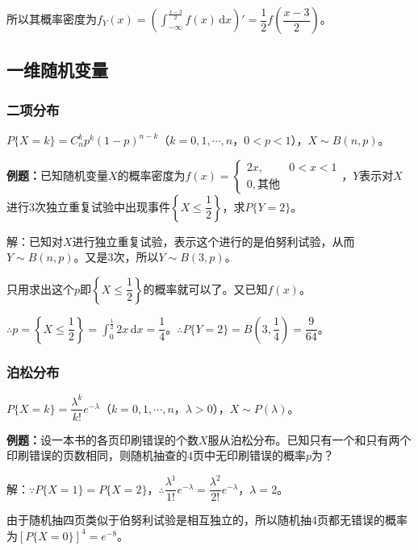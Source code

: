 所以其概率密度为$f_Y(x)=(\int_{-\infty}^{\frac{x-3}{2}}f(x)\,\textrm{d}x)'=\dfrac{1}{2}f\left(\dfrac{x-3}{2}\right)$。

\subsection{一维随机变量}

\paragraph{}

\subsubsection{二项分布}

$P\{X=k\}=C_n^kp^k(1-p)^{n-k}$（$k=0,1,\cdots,n$，$0<p<1$），$X\sim B(n,p)$。

\textbf{例题：}已知随机变量$X$的概率密度为$f(x)=\left\{\begin{array}{ll}
    2x, & 0<x<1 \\
    0, \text{其他}
\end{array}\right.$，$Y$表示对$X$进行3次独立重复试验中出现事件$\left\{X\leqslant\dfrac{1}{2}\right\}$，求$P\{Y=2\}$。\medskip

解：已知对$X$进行独立重复试验，表示这个进行的是伯努利试验，从而$Y\sim B(n,p)$。又是3次，所以$Y\sim B(3,p)$。

只用求出这个$p$即$\left\{X\leqslant\dfrac{1}{2}\right\}$的概率就可以了。又已知$f(x)$。

$\therefore p=\left\{X\leqslant\dfrac{1}{2}\right\}=\int_0^\frac{1}{2}2x\,\textrm{d}x=\dfrac{1}{4}$。$\therefore P\{Y=2\}=B\left(3,\dfrac{1}{4}\right)=\dfrac{9}{64}$。

\subsubsection{泊松分布}

$P\{X=k\}=\dfrac{\lambda^k}{k!}e^{-\lambda}$（$k=0,1,\cdots,n$，$\lambda>0$），$X\sim P(\lambda)$。

\textbf{例题：}设一本书的各页印刷错误的个数$X$服从泊松分布。已知只有一个和只有两个印刷错误的页数相同，则随机抽查的4页中无印刷错误的概率$p$为？

解：$\because P\{X=1\}=P\{X=2\}$，$\therefore\dfrac{\lambda^1}{1!}e^{-\lambda}=\dfrac{\lambda^2}{2!}e^{-\lambda}$，$\lambda=2$。

由于随机抽四页类似于伯努利试验是相互独立的，所以随机抽4页都无错误的概率为$[P\{X=0\}]^4=e^{-8}$。

